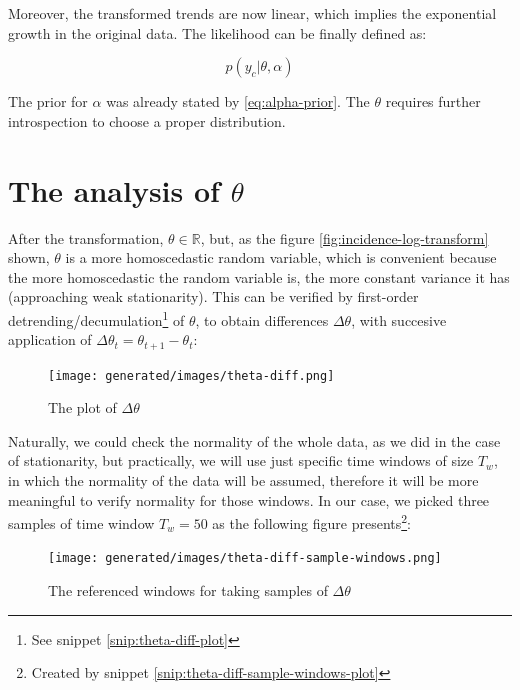 \documentclass[
  digital, %
  oneside, %
  lof,     %
  lot,     %
]{fithesis4}
\begin{document}
Moreover, the transformed trends are now linear, which implies the exponential growth in the original data.
The likelihood can be finally defined as:

\begin{equation}\label{eq:likelihood-first}
  p( y_c | \theta, \alpha )
\end{equation}

The prior for $\alpha$ was already stated by \eqref{eq:alpha-prior}.
The $\theta$ requires further introspection to choose a proper distribution.


\section{The analysis of \texorpdfstring{$\theta$}{Lg}}
\label{sec:theta-analysis}

After the transformation, $\theta \in \mathbb{R}$, but, as the figure \ref{fig:incidence-log-transform} shown, $\theta$ is a more homoscedastic random variable, which is convenient because the more homoscedastic the random variable is, the more constant variance it has (approaching weak stationarity).
This can be verified by first-order detrending/decumulation\footnote{See snippet \ref{snip:theta-diff-plot}} of $\theta$, to obtain differences $\Delta \theta$, with succesive application of $\Delta \theta_t = \theta_{t+1} - \theta_{t}$:

\begin{figure}[H]
  \begin{center}
    \texttt{[image: generated/images/theta-diff.png]}
  \end{center}
  \caption{The plot of $\Delta \theta$}
  \label{fig:theta-diff}
\end{figure}

Naturally, we could check the normality of the whole data, as we did in the case of stationarity, but practically, we will use just specific time windows of size $T_w$, in which the normality of the data will be assumed, therefore it will be more meaningful to verify normality for those windows.
In our case, we picked three samples of time window $T_w = 50$ as the following figure presents\footnote{Created by snippet \ref{snip:theta-diff-sample-windows-plot}}:

\begin{figure}[H]
  \begin{center}
    \texttt{[image: generated/images/theta-diff-sample-windows.png]}
  \end{center}
  \caption{The referenced windows for taking samples of $\Delta \theta$}
  \label{fig:theta-sample-windows}
\end{figure}
\end{document}
